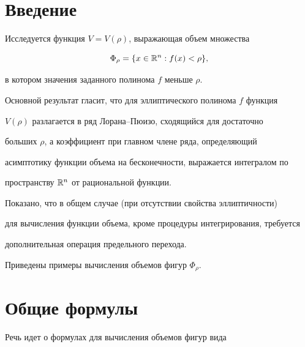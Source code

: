 \maketitle


\label{begin}














\section*{Введение}





Исследуется функция $V=V(\rho)$, выражающая объем множества


$$


\Phi_\rho=\{ x\in {\Bbb R}^n : f(x)<\rho\},


$$


в котором значения заданного полинома $f$ меньше $\rho$.


Основной результат гласит, что для эллиптического полинома $f$ функция


$V(\rho)$ разлагается в ряд Лорана--Пюизо, сходящийся для достаточно


больших $\rho$, а коэффициент при главном члене ряда, определяющий


асимптотику функции объема на бесконечности, выражается интегралом по


пространству $\Bbb R^n$ от рациональной функции.


Показано, что в общем случае (при отсутствии свойства эллиптичности)


для вычисления функции объема, кроме процедуры интегрирования, требуется


дополнительная операция предельного перехода.


Приведены примеры вычисления объемов фигур $\Phi_\rho$.





\section{Общие формулы}





Речь идет о формулах для вычисления объемов фигур вида


